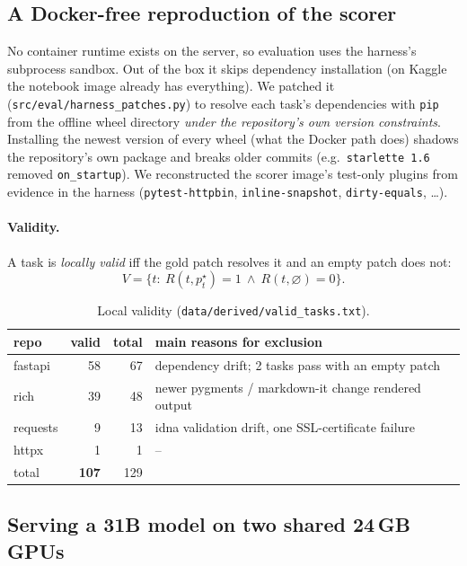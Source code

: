 \documentclass[10pt,a4paper]{article}
\newcommand{\code}[1]{\texttt{#1}}
\newcommand{\1}{\mathbb{1}}
\begin{document}
\subsection{A Docker-free reproduction of the scorer}
No container runtime exists on the server, so evaluation uses the harness's subprocess sandbox. Out of the
box it skips dependency installation (on Kaggle the notebook image already has everything). We patched it
(\code{src/eval/harness\_patches.py}) to resolve each task's dependencies with \code{pip} from the offline
wheel directory \emph{under the repository's own version constraints}. Installing the newest version of
every wheel (what the Docker path does) shadows the repository's own package and breaks older commits
(e.g.\ \code{starlette 1.6} removed \code{on\_startup}). We reconstructed the scorer image's test-only
plugins from evidence in the harness (\code{pytest-httpbin}, \code{inline-snapshot}, \code{dirty-equals}, \dots).

\paragraph{Validity.} A task is \emph{locally valid} iff the gold patch resolves it and an empty patch does not:
\[
V=\{t:\ R(t,p^\star_t)=1\ \wedge\ R(t,\varnothing)=0\}.
\]
\begin{table}[H]\centering\small
\begin{tabular}{lrrl}\toprule
repo & valid & total & main reasons for exclusion \\\midrule
fastapi & 58 & 67 & dependency drift; 2 tasks pass with an empty patch\\
rich & 39 & 48 & newer pygments / markdown-it change rendered output\\
requests & 9 & 13 & idna validation drift, one SSL-certificate failure\\
httpx & 1 & 1 & -- \\\midrule
total & \textbf{107} & 129 & \\\bottomrule
\end{tabular}\caption{Local validity (\code{data/derived/valid\_tasks.txt}).}
\end{table}

\subsection{Serving a 31B model on two shared 24\,GB GPUs}
\end{document}
